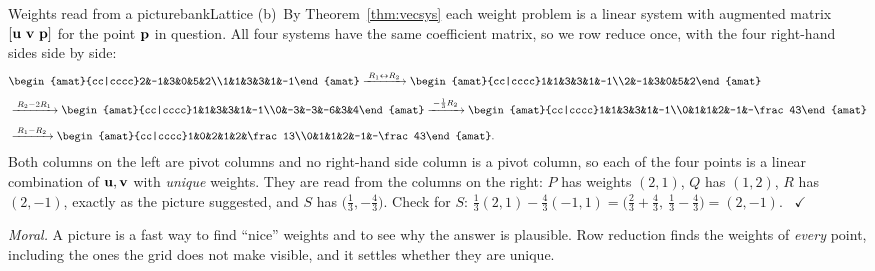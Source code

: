 \documentclass[11pt]{article}
\begin{document}
\begin{exmp}{Weights read from a picture}{bankLattice}
(b)~By Theorem~\ref{thm:vecsys} each weight problem is a linear system with augmented matrix $[\bv{u}\ \bv{v}\ \bv{p}]$ for the point $\mathbf{p}$ in question. All four systems have the same coefficient matrix, so we row reduce once, with the four right-hand sides side by side:
\begin{align*}
&\begin{amat}{cc|cccc}2&-1&3&0&5&2\\1&1&3&3&1&-1\end{amat}
\rops{R_1\leftrightarrow R_2}
\begin{amat}{cc|cccc}1&1&3&3&1&-1\\2&-1&3&0&5&2\end{amat}\\[4pt]
&\rops{R_2-2R_1}
\begin{amat}{cc|cccc}1&1&3&3&1&-1\\0&-3&-3&-6&3&4\end{amat}
\rops{-\frac13R_2}
\begin{amat}{cc|cccc}1&1&3&3&1&-1\\0&1&1&2&-1&-\frac43\end{amat}\\[4pt]
&\rops{R_1-R_2}
\begin{amat}{cc|cccc}1&0&2&1&2&\frac13\\0&1&1&2&-1&-\frac43\end{amat}.
\end{align*}
Both columns on the left are pivot columns and no right-hand side column is a pivot column, so each of the four points is a linear combination of $\mathbf{u},\mathbf{v}$ with \emph{unique} weights. They are read from the columns on the right: $P$ has weights $(2,1)$, $Q$ has $(1,2)$, $R$ has $(2,-1)$, exactly as the picture suggested, and $S$ has $\bigl(\tfrac13,-\tfrac43\bigr)$. Check for $S$: $\tfrac13(2,1)-\tfrac43(-1,1)=\bigl(\tfrac23+\tfrac43,\ \tfrac13-\tfrac43\bigr)=(2,-1)$. \ $\checkmark$

\emph{Moral.} A picture is a fast way to find ``nice'' weights and to see why the answer is plausible. Row reduction finds the weights of \emph{every} point, including the ones the grid does not make visible, and it settles whether they are unique.
\end{exmp}
\end{document}
